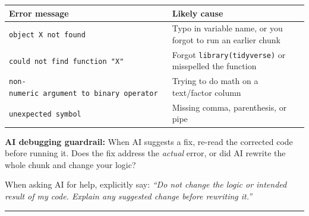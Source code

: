 \documentclass[
  letterpaper,
  DIV=11,
  numbers=noendperiod,
  oneside]{scrreprt}
\begin{document}
\begin{longtable}[]{@{}
  >{\raggedright\arraybackslash}p{}
  >{\raggedright\arraybackslash}p{}@{}}
\toprule\noalign{}
\begin{minipage}[b]{\linewidth}\raggedright
Error message
\end{minipage} & \begin{minipage}[b]{\linewidth}\raggedright
Likely cause
\end{minipage} \\
\midrule\noalign{}
\endhead
\bottomrule\noalign{}
\endlastfoot
\texttt{object\ \textquotesingle{}X\textquotesingle{}\ not\ found} &
Typo in variable name, or you forgot to run an earlier chunk \\
\texttt{could\ not\ find\ function\ "X"} & Forgot
\texttt{library(tidyverse)} or misspelled the function \\
\texttt{non-numeric\ argument\ to\ binary\ operator} & Trying to do math
on a text/factor column \\
\texttt{unexpected\ symbol} & Missing comma, parenthesis, or pipe \\
\end{longtable}

\begin{tcolorbox}[enhanced jigsaw, title=\textcolor{quarto-callout-warning-color}{\faExclamationTriangle}\hspace{0.5em}{Warning}, arc=.35mm, toptitle=1mm, colframe=quarto-callout-warning-color-frame, toprule=.15mm, leftrule=.75mm, bottomtitle=1mm, opacityback=0, bottomrule=.15mm, coltitle=black, breakable, opacitybacktitle=0.6, titlerule=0mm, colback=white, left=2mm, colbacktitle=quarto-callout-warning-color!10!white, rightrule=.15mm]

\textbf{AI debugging guardrail:} When AI suggests a fix, re-read the
corrected code before running it. Does the fix address the \emph{actual}
error, or did AI rewrite the whole chunk and change your logic?

When asking AI for help, explicitly say: \emph{``Do not change the logic
or intended result of my code. Explain any suggested change before
rewriting it.''}

\end{tcolorbox}

\begin{center}\rule{0.5\linewidth}{0.5pt}\end{center}
\end{document}
